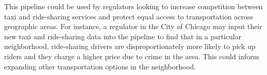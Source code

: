 \documentclass[10pt]{article}
\begin{document}
This pipeline could be used by regulators looking to increase competition between taxi and ride-sharing services and protect equal access to transportation across geographic areas. For instance, a regulator in the City of Chicago may input their new taxi and ride-sharing data into the pipeline to find that in a particular neighborhood, ride-sharing drivers are disproportionately more likely to pick up riders and they charge a higher price due to crime in the area. This could inform expanding other transportation options in the neighborhood.
\theendnotes
\end{document}

